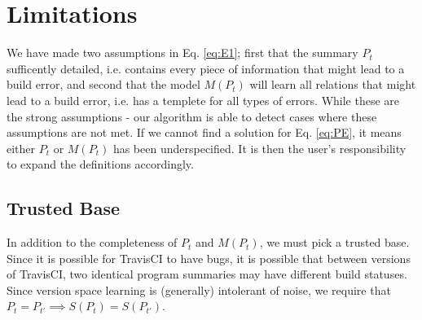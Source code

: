\section{Limitations}

We have made two assumptions in Eq. \ref{eq:E1}; first that the summary $P_t$ sufficently detailed, i.e. contains every piece of information that might lead to a build error, and second that the model $M(P_t)$ will learn all relations that might lead to a build error, i.e. has a templete for all types of errors.
While these are the strong assumptions - our algorithm is able to detect cases where these assumptions are not met.
If we cannot find a solution for Eq. \ref{eq:PE}, it means either $P_t$ or $M(P_t)$ has been underspecified.
It is then the user's responsibility to expand the definitions accordingly.


\subsection{Trusted Base}
In addition to the completeness of $P_t$ and $M(P_t)$, we must pick a trusted base.
Since it is possible for TravisCI to have bugs, it is possible that between versions of TravisCI, two identical program summaries may have different build statuses.
Since version space learning is (generally) intolerant of noise, we require that
$P_t = P_{t'} \implies S(P_t) = S(P_{t'})$.

